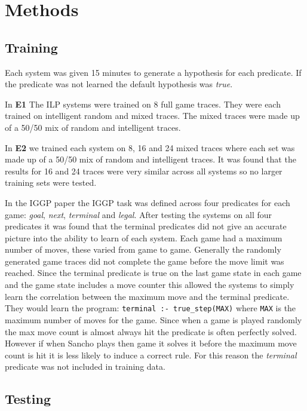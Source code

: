 \section{Methods}
\subsection{Training}

Each system was given 15 minutes to generate a hypothesis for each predicate. If the predicate was not learned the default hypothesis was \textit{true}. 

In \textbf{E1} The ILP systems were trained on 8 full game traces. They were each trained on intelligent random and mixed traces. The mixed traces were made up of a 50/50 mix of random and intelligent traces. 

In \textbf{E2} we trained each system on 8, 16 and 24 mixed traces where each set was made up of a 50/50 mix of random and intelligent traces. It was found that the results for 16 and 24 traces were very similar across all systems so no larger training sets were tested.

In the IGGP paper\cite{Cropper/IGGP} the IGGP task was defined across four predicates for each game: \textit{goal}, \textit{next}, \textit{terminal} and \textit{legal}. After testing the systems on all four predicates it was found that the terminal predicates did not give an accurate picture into the ability to learn of each system. Each game had a maximum number of moves, these varied from game to game. Generally the randomly generated game traces did not complete the game before the move limit was reached. Since the terminal predicate is true on the last game state in each game and the game state includes a move counter this allowed the systems to simply learn the correlation between the maximum move and the terminal predicate. They would learn the program: \verb|terminal :- true_step(MAX)| where \verb|MAX| is the maximum number of moves for the game. Since when a game is played randomly the max move count is almost always hit the predicate is often perfectly solved. However if when Sancho plays then game it solves it before the maximum move count is hit it is less likely to induce a correct rule. For this reason the \textit{terminal} predicate was not included in training data.

\subsection{Testing}

